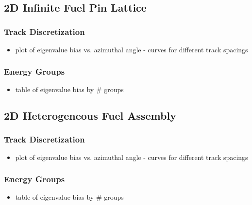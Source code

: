\subsection{2D Infinite Fuel Pin Lattice}
\label{subsec:chap4-inf-lattice}

\subsubsection{Track Discretization}
\label{subsubsec:chap4-inf-lattice-tracks}

\begin{itemize}
  \item plot of eigenvalue bias vs. azimuthal angle - curves for different track spacings
\end{itemize}

\subsubsection{Energy Groups}
\label{subsubsec:chap4-pin-energy}

\begin{itemize}
  \item table of eigenvalue bias by \# groups
\end{itemize}

\subsection{2D Heterogeneous Fuel Assembly}

\subsubsection{Track Discretization}
\label{subsubsec:chap4-hetero-lattice-tracks}

\begin{itemize}
  \item plot of eigenvalue bias vs. azimuthal angle - curves for different track spacings
\end{itemize}

\subsubsection{Energy Groups}
\label{subsubsec:chap4-hetero-lattice-energy}

\begin{itemize}
  \item table of eigenvalue bias by \# groups
\end{itemize}
